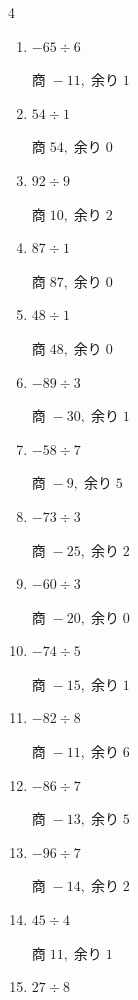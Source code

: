 \begin{multicols}{4}
\begin{enumerate}
        $商\; -36,\; 余り\; 1$

  \item $-65 \div 6$

        $商\; -11,\; 余り\; 1$

  \item $54 \div 1$

        $商\; 54,\; 余り\; 0$

  \item $92 \div 9$

        $商\; 10,\; 余り\; 2$

  \item $87 \div 1$

        $商\; 87,\; 余り\; 0$

  \item $48 \div 1$

        $商\; 48,\; 余り\; 0$

  \item $-89 \div 3$

        $商\; -30,\; 余り\; 1$

  \item $-58 \div 7$

        $商\; -9,\; 余り\; 5$

  \item $-73 \div 3$

        $商\; -25,\; 余り\; 2$

  \item $-60 \div 3$

        $商\; -20,\; 余り\; 0$

  \item $-74 \div 5$

        $商\; -15,\; 余り\; 1$

\columnbreak %

  \item $-82 \div 8$

        $商\; -11,\; 余り\; 6$

  \item $-86 \div 7$

        $商\; -13,\; 余り\; 5$

  \item $-96 \div 7$

        $商\; -14,\; 余り\; 2$

  \item $45 \div 4$

        $商\; 11,\; 余り\; 1$

  \item $27 \div 8$


\end{enumerate}
\end{multicols}
